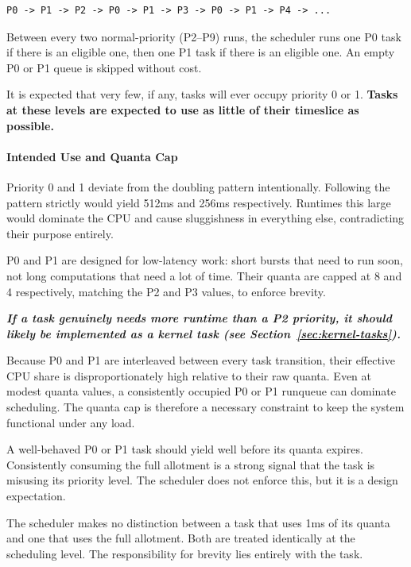 \documentclass[11pt]{article}
\begin{document}
\begin{Verbatim}[fontsize=\small]
	P0 -> P1 -> P2 -> P0 -> P1 -> P3 -> P0 -> P1 -> P4 -> ...
\end{Verbatim}

Between every two normal-priority (P2--P9) runs, the scheduler runs one P0 task if there is an eligible one, then one P1 task if there is an eligible one.
An empty P0 or P1 queue is skipped without cost.

It is expected that very few, if any, tasks will ever occupy priority 0 or 1. \textbf{Tasks at these levels are expected to use as little of their timeslice as possible.}

\paragraph{Intended Use and Quanta Cap}

Priority 0 and 1 deviate from the doubling pattern intentionally.
Following the pattern strictly would yield 512ms and 256ms respectively.
Runtimes this large would dominate the CPU and cause sluggishness in everything else, contradicting their purpose entirely.

P0 and P1 are designed for low-latency work: short bursts that need to run soon, not long computations that need a lot of time.
Their quanta are capped at 8 and 4 respectively, matching the P2 and P3 values, to enforce brevity.

\begin{specnote}
	\textit{\textbf{If a task genuinely needs more runtime than a P2 priority, it should likely be implemented as a kernel task (see Section~\ref{sec:kernel-tasks}).}}
\end{specnote}

Because P0 and P1 are interleaved between every task transition, their effective CPU share is disproportionately high relative to their raw quanta.
Even at modest quanta values, a consistently occupied P0 or P1 runqueue can dominate scheduling.
The quanta cap is therefore a necessary constraint to keep the system functional under any load.

A well-behaved P0 or P1 task should yield well before its quanta expires.
Consistently consuming the full allotment is a strong signal that the task is misusing its priority level.
The scheduler does not enforce this, but it is a design expectation.

The scheduler makes no distinction between a task that uses 1ms of its quanta and one that uses the full allotment.
Both are treated identically at the scheduling level.
The responsibility for brevity lies entirely with the task.
\end{document}
